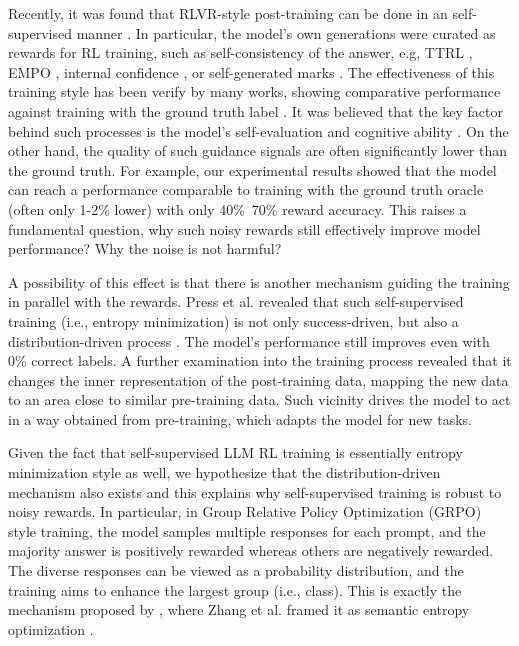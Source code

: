 \documentclass{article}
\begin{document}
Recently, it was found that RLVR-style post-training can be done in an self-supervised manner \cite{zuottrl,zhangright,zhangconsistent,agarwalunreasonable}. In particular, the model's own generations were curated as rewards for RL training, such as self-consistency of the answer, e.g, TTRL \cite{zuottrl}, EMPO \cite{zhangright}, internal confidence \cite{agarwalunreasonable}, or self-generated marks \cite{yuan2024self,wu2025meta}. The effectiveness of this training style has been verify by many works, showing comparative performance against training with the ground truth label \cite{zuottrl,zhangright}. It was believed that the key factor behind such processes is the model's self-evaluation \cite{zuottrl,yuan2024self,wu2025meta} and cognitive ability \cite{gandhicognitive}. On the other hand, the quality of such guidance signals are often significantly lower than the ground truth. For example, our experimental results showed that the model can reach a performance comparable to training with the ground truth oracle (often only 1-2\% lower) with only 40\%~70\% reward accuracy. This raises a fundamental question, why such noisy rewards still effectively improve model performance? Why the noise is not harmful?

A possibility of this effect is that there is another mechanism guiding the training in parallel with the rewards. Press et al. revealed that such self-supervised training (i.e., entropy minimization) is not only success-driven, but also a distribution-driven process \cite{press2024entropy}. The model's performance still improves even with 0\% correct labels. A further examination into the training process revealed that it changes the inner representation of the post-training data, mapping the new data to an area close to similar pre-training data. Such vicinity drives the model to act in a way obtained from pre-training, which adapts the model for new tasks.


Given the fact that self-supervised LLM RL training is essentially entropy minimization style as well, we hypothesize that the distribution-driven mechanism also exists and this explains why self-supervised training is robust to noisy rewards. In particular, in Group Relative Policy Optimization (GRPO) style training, the model samples multiple responses for each prompt, and the majority answer is positively rewarded whereas others are negatively rewarded. The diverse responses can be viewed as a probability distribution, and the training aims to enhance the largest group (i.e., class). This is exactly the mechanism proposed by \cite{zuottrl,zhangright}, where Zhang et al. framed it as semantic entropy optimization \cite{zhangright}. 
\end{document}
